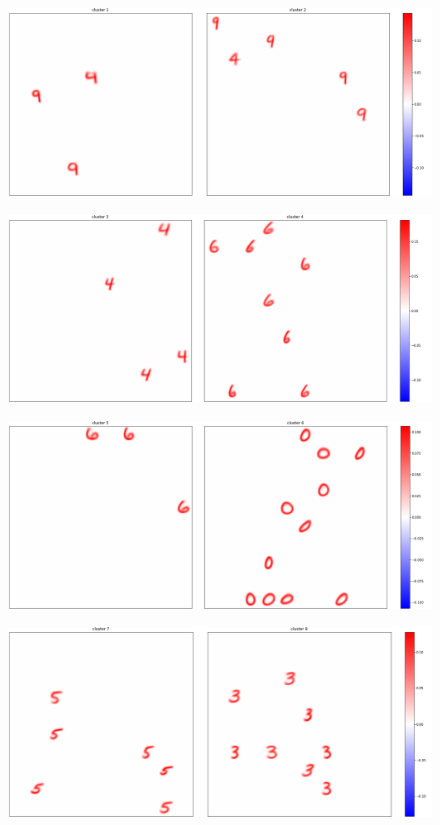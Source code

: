 \documentclass[a4paper]{report}
\begin{document}
\begin{figure} [H]
    \centering
    \includegraphics [width=\textwidth ] {c/h/1.png}
    \caption{}
\end{figure}

\begin{figure} [H]
    \centering
    \includegraphics [width=\textwidth ] {c/h/3.png}
    \caption{}
\end{figure}

\begin{figure} [H]
    \centering
    \includegraphics [width=\textwidth ] {c/h/5.png}
    \caption{}
\end{figure}

\begin{figure} [H]
    \centering
    \includegraphics [width=\textwidth ] {c/h/7.png}
    \caption{}
\end{figure}
\end{document}
